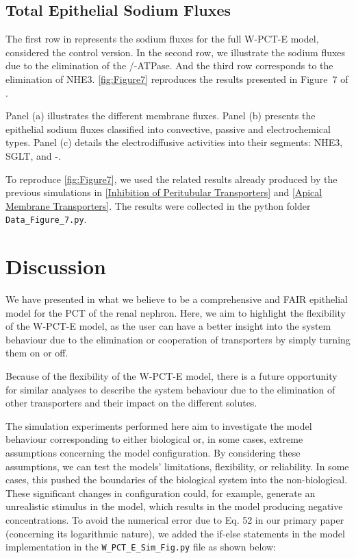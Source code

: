 \documentclass[fleqn,10pt]{physiome}
\begin{document}
\subsection{Total Epithelial Sodium Fluxes}

The first row in \cite[Figure 7]{noroozbabaee2022modular} represents the sodium fluxes for the full W-PCT-E model, considered the control version. In the second row, we illustrate the sodium fluxes due to the elimination of the /-ATPase. And the third row corresponds to the elimination of NHE3. \autoref{fig:Figure7}  reproduces the results presented in Figure~7 of \cite{noroozbabaee2022modular}.

Panel (a) illustrates the different membrane fluxes. Panel (b) presents the epithelial sodium fluxes classified into convective, passive and electrochemical types. Panel (c) details the electrodiffusive activities into their segments: NHE3, SGLT, and -. 

To reproduce \autoref{fig:Figure7}, we used the related results already produced by the previous simulations in \autoref{Inhibition of Peritubular Transporters} and \autoref{Apical Membrane Transporters}.  The results were collected in the python folder \texttt{Data\_Figure\_7.py}.


\section{Discussion}
We have presented in \cite{noroozbabaee2022modular} what we believe to be a comprehensive and FAIR epithelial model for the PCT of the renal nephron.
Here, we aim to highlight the flexibility of the W-PCT-E model, as the user can have a better insight into the system behaviour due to the elimination or cooperation of transporters by simply turning them on or off.

Because of the flexibility of the W-PCT-E model, there is a future opportunity for similar analyses to describe the system behaviour due to the elimination of other transporters and their impact on the different solutes. 

The simulation experiments performed here aim to investigate the model behaviour corresponding to either biological or, in some cases, extreme assumptions concerning the model configuration. By considering these assumptions, we can test the models' limitations, flexibility, or reliability. 
In some cases, this pushed the boundaries of the biological system into the non-biological. These significant changes in configuration could, for example, generate an unrealistic stimulus in the model, which results in the model producing negative concentrations. To avoid the numerical error due to Eq. 52 in our primary paper (concerning its logarithmic nature), we added the if-else statements in the model implementation in the \texttt{W\_PCT\_E\_Sim\_Fig.py} file as shown below: 
\end{document}
